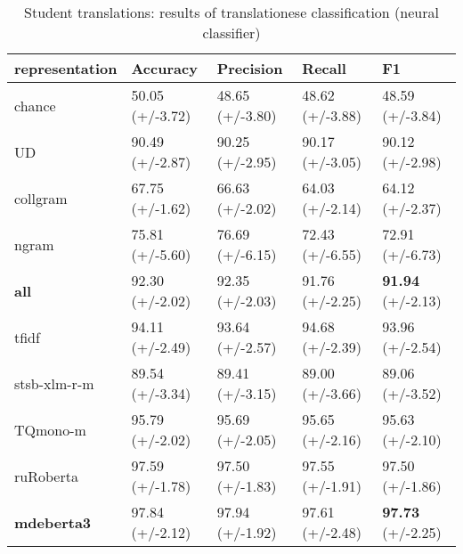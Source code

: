 \begin{table}[H]
	\centering
	\begin{tabular}{l|llll}
		\toprule
		representation & Accuracy        & Precision       & Recall          & F1              \\
		\midrule
		chance          & 50.05 (+/-3.72) & 48.65 (+/-3.80) & 48.62 (+/-3.88) & 48.59 (+/-3.84) \\
		\midrule
		UD              & 90.49 (+/-2.87) & 90.25 (+/-2.95) & 90.17 (+/-3.05) & 90.12 (+/-2.98) \\
		collgram        & 67.75 (+/-1.62) & 66.63 (+/-2.02) & 64.03 (+/-2.14) & 64.12 (+/-2.37) \\
		ngram           & 75.81 (+/-5.60) & 76.69 (+/-6.15) & 72.43 (+/-6.55) & 72.91 (+/-6.73) \\
		\textbf{all}             & 92.30 (+/-2.02) & 92.35 (+/-2.03) & 91.76 (+/-2.25) & \textbf{91.94} (+/-2.13) \\
		\midrule
		tfidf           & 94.11 (+/-2.49) & 93.64 (+/-2.57) & 94.68 (+/-2.39) & 93.96 (+/-2.54) \\
		\midrule
		stsb-xlm-r-m   & 89.54 (+/-3.34) & 89.41 (+/-3.15) & 89.00 (+/-3.66) & 89.06 (+/-3.52) \\
		TQmono-m & 95.79 (+/-2.02) & 95.69 (+/-2.05) & 95.65 (+/-2.16) & 95.63 (+/-2.10) \\
		ruRoberta & 97.59 (+/-1.78) & 97.50 (+/-1.83) & 97.55 (+/-1.91) & 97.50 (+/-1.86) \\
		\textbf{mdeberta3}  & 97.84 (+/-2.12) & 97.94 (+/-1.92) & 97.61 (+/-2.48) & \boxit{0.4in} \textbf{97.73} (+/-2.25) \\
	\bottomrule
	\end{tabular}
	\caption{\label{tab:stu-ref_neu}Student translations: results of translationese classification (neural classifier)}
\end{table}



